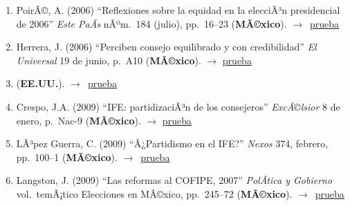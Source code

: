 \documentclass[12 pt, letter]{article}
\newenvironment{CitasMiTrabajo}{
    \begin{footnotesize}
    \begin{enumerate}[label={\footnotesize\emph{cita~\arabic*}},ref=\arabic*] %
        \setlength{\itemsep}{.1\itemsep}
        \setlength{\parskip}{.1\parskip}
    }{\end{enumerate}\end{footnotesize}}
\begin{document}

        \begin{CitasMiTrabajo}

        \item PoirÃ©, A. (2006)
        ``Reflexiones sobre la equidad en la
        elecciÃ³n presidencial de 2006'' \emph{Este PaÃ­s} nÃºm.\ 184
        (julio), pp.\ 16--23  (\textbf{MÃ©xico}). $\rightarrow$~\href{http://ericmagar.com/cv/cites/estevezEtalElecStud/poire.pdf}{prueba}

        \item Herrera, J. (2006)
        ``Perciben consejo equilibrado y con
        credibilidad'' \emph{El Universal} 19 de junio, p.\ A10  (\textbf{MÃ©xico}). $\rightarrow$ \href{http://ericmagar.com/cv/cites/estevezEtalElecStud/univ.pdf}{prueba}

        \item {} (\textbf{EE.UU.}). $\rightarrow$~\href{http://ericmagar.com/cv/cites/estevezEtalElecStud/eisen.pdf}{prueba}

        \item Crespo, J.A. (2009)
        ``IFE: partidizaciÃ³n de los consejeros''
        \emph{ExcÃ©lsior} 8 de enero, p.\ Nac-9 (\textbf{MÃ©xico}). $\rightarrow$ \href{http://ericmagar.com/cv/cites/estevezEtalElecStud/crespo.pdf}{prueba}

        \item LÃ³pez Guerra, C. (2009)
        ``Â¿Partidismo en el IFE?''
        \emph{Nexos} 374, febrero, pp.\ 100--1 (\textbf{MÃ©xico}). $\rightarrow$~\href{http://ericmagar.com/cv/cites/estevezEtalElecStud/lg.pdf}{prueba}

        \item Langston, J. (2009) ``Las reformas al COFIPE, 2007''
            \emph{PolÃ­tica y Gobierno}
            vol.\ temÃ¡tico Elecciones en MÃ©xico, pp.\ 245--72 (\textbf{MÃ©xico}). $\rightarrow$~\href{http://ericmagar.com/cv/cites/estevezEtalElecStud/langstonRefCofipe2009pyg.excerpt.pdf}{prueba}
            

\end{CitasMiTrabajo}
\end{document}
